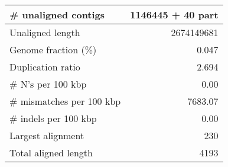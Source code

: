 \documentclass[12pt,a4paper]{article}
\begin{document}
\begin{table}[ht]
\begin{center}
\begin{tabular}{|l*{1}{|r}|}
\# unaligned contigs & 1146445 + 40 part \\ \hline
Unaligned length & 2674149681 \\ \hline
Genome fraction (\%) & 0.047 \\ \hline
Duplication ratio & 2.694 \\ \hline
\# N's per 100 kbp & 0.00 \\ \hline
\# mismatches per 100 kbp & 7683.07 \\ \hline
\# indels per 100 kbp & 0.00 \\ \hline
Largest alignment & 230 \\ \hline
Total aligned length & 4193 \\ \hline
\end{tabular}
\end{center}
\end{table}
\end{document}

